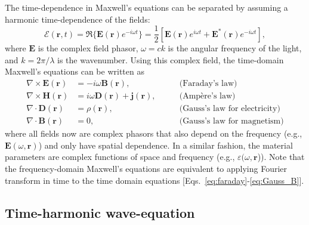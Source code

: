 The time-dependence in Maxwell's equations can be separated by assuming a
harmonic time-dependence of the fields:
\begin{equation}
    \bm{\mathcal{E}}(\mathbf{r}, t) = \Re \{ \mathbf{E}(\mathbf{r}) e^{-i\omega
            t} \}= \frac{1}{2}\left[ \mathbf{E}(\mathbf{r}) e^{i\omega t} +
        \mathbf{E}^*(\mathbf{r}) e^{-i\omega t}\right],
\end{equation}
where $\mathbf{E}$ is the complex field phasor, $\omega=ck$ is the angular
frequency of the light, and $k=2\pi/\lambda$ is the wavenumber.
Using this complex field, the time-domain Maxwell's equations can be written as
\begin{align}
    \nabla \times \mathbf{E}(\mathbf{r}) & = -i\omega \mathbf{B}(\mathbf{r}),
    \quad \quad                          & \text{(Faraday's law)} \label{eq:curlE_freq}                                   \\
    \nabla \times \mathbf{H}(\mathbf{r}) & = i\omega  \mathbf{D}(\mathbf{r}) +
    \mathbf{j}(\mathbf{r}), \quad \quad  & \text{(Ampère's law)}
    \label{eq:curlH_freq}                                                                                                 \\
    \nabla \cdot \mathbf{D}(\mathbf{r})  & = \rho(\mathbf{r}), \quad \quad
                                         & \text{(Gauss's law for electricity)} \label{eq:divD_freq}                      \\
    \nabla \cdot \mathbf{B}(\mathbf{r})  & = 0, \quad \quad                                          & \text{(Gauss's law
        for magnetism)} \label{eq:divB_freq}
\end{align}
where all fields now are complex phasors that also depend on the frequency
(e.g., $\mathbf{E}(\omega, \mathbf{r})$) and only have spatial dependence. In a
similar fashion,
the material parameters are complex functions of space and frequency (e.g.,
$\varepsilon(\omega, \mathbf{r}$)).
    Note that the frequency-domain Maxwell's equations are equivalent to applying
    Fourier transform in time to the time domain
    equations [Eqs.~\eqref{eq:faraday}-\eqref{eq:Gauss_B}].

    \subsection*{Time-harmonic wave-equation}

